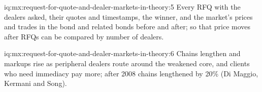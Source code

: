 \begin{solution}{iq:mx:request-for-quote-and-dealer-markets-in-theory:5}
Every RFQ with the dealers asked, their quotes and timestamps, the winner, and the market's prices and trades in the bond and related bonds before and
after; so that price moves after RFQs can be compared by number of dealers.
\end{solution}

\begin{solution}{iq:mx:request-for-quote-and-dealer-markets-in-theory:6}
Chains lengthen and markups rise as peripheral dealers route around the weakened core, and clients who need immediacy pay more; after 2008 chains
lengthened by 20\% (Di Maggio, Kermani and Song).
\end{solution}
